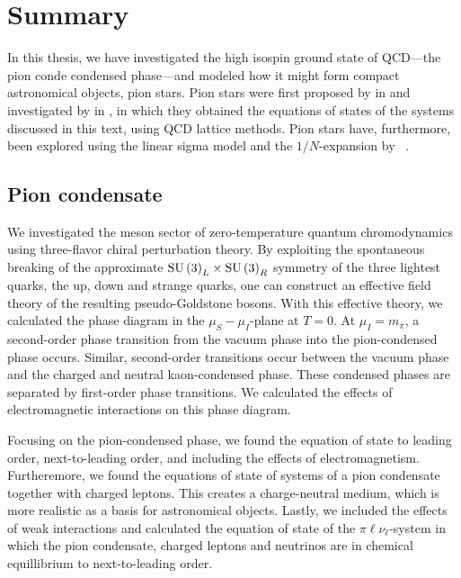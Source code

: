 \section{Summary}


In this thesis, we have investigated the high isospin ground state of QCD---the pion conde condensed phase---and modeled how it might form compact astronomical objects, pion stars.
Pion stars were first proposed by \citeauthor{carignanoScrutinizingPionCondensed2017} in \autocite{carignanoScrutinizingPionCondensed2017} and investigated by \citeauthor{brandtNewClassCompact2018} in \autocite{brandtNewClassCompact2018}, in which they obtained the equations of states of the systems discussed in this text, using QCD lattice methods.
Pion stars have, furthermore, been explored using the linear sigma model and the $1/N$-expansion by \citeauthor{andersenBoseEinsteinCondensationPion2018}~\autocite{andersenBoseEinsteinCondensationPion2018}.


\subsection{Pion condensate}

We investigated the meson sector of zero-temperature quantum chromodynamics using three-flavor chiral perturbation theory.
By exploiting the spontaneous breaking of the approximate $\text{SU}\left(3\right)_L\times\text{SU}\left(3\right)_R$ symmetry of the three lightest quarks, the up, down and strange quarks, one can construct an effective field theory of the resulting pseudo-Goldstone bosons.
With this effective theory, we calculated the phase diagram in the $\mu_S-\mu_I$-plane at $T = 0$.
At $\mu_I = m_\pi$, a second-order phase transition from the vacuum phase into the pion-condensed phase occurs.
Similar, second-order transitions occur between the vacuum phase and the charged and neutral kaon-condensed phase.
These condensed phases are separated by first-order phase transitions.
We calculated the effects of electromagnetic interactions on this phase diagram.

Focusing on the pion-condensed phase, we found the equation of state to leading order, next-to-leading order, and including the effects of electromagnetism.
Furtheremore, we found the equations of state of systems of a pion condensate together with charged leptons.
This creates a charge-neutral medium, which is more realistic as a basis for astronomical objects.
Lastly, we included the effects of weak interactions and calculated the equation of state of the $\pi\ell\nu_\ell$-system in which the pion condensate, charged leptons and neutrinos are in chemical equillibrium to next-to-leading order.


